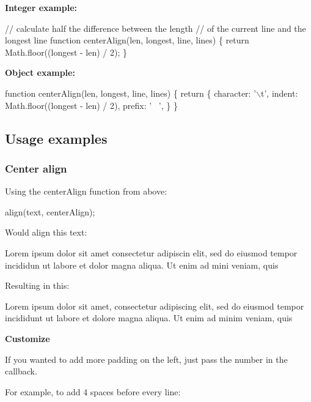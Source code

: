 {\bfseries Integer example\+:}


\begin{DoxyCode}
// calculate half the difference between the length
// of the current line and the longest line
function centerAlign(len, longest, line, lines) \{
  return Math.floor((longest - len) / 2);
\}
\end{DoxyCode}


{\bfseries Object example\+:}


\begin{DoxyCode}
function centerAlign(len, longest, line, lines) \{
  return \{
    character: '\(\backslash\)t',
    indent: Math.floor((longest - len) / 2),
    prefix: '~ ',
  \}
\}
\end{DoxyCode}


\subsection*{Usage examples}

\subsubsection*{Center align}

Using the {\ttfamily center\+Align} function from above\+:


\begin{DoxyCode}
align(text, centerAlign);
\end{DoxyCode}


Would align this text\+:


\begin{DoxyCode}
Lorem ipsum dolor sit amet
consectetur adipiscin
elit, sed do eiusmod tempor incididun
ut labore et dolor
magna aliqua. Ut enim ad mini
veniam, quis
\end{DoxyCode}


Resulting in this\+:


\begin{DoxyCode}
     Lorem ipsum dolor sit amet,
        consectetur adipiscing
elit, sed do eiusmod tempor incididunt
         ut labore et dolore
    magna aliqua. Ut enim ad minim
             veniam, quis
\end{DoxyCode}


{\bfseries Customize}

If you wanted to add more padding on the left, just pass the number in the callback.

For example, to add 4 spaces before every line\+:


